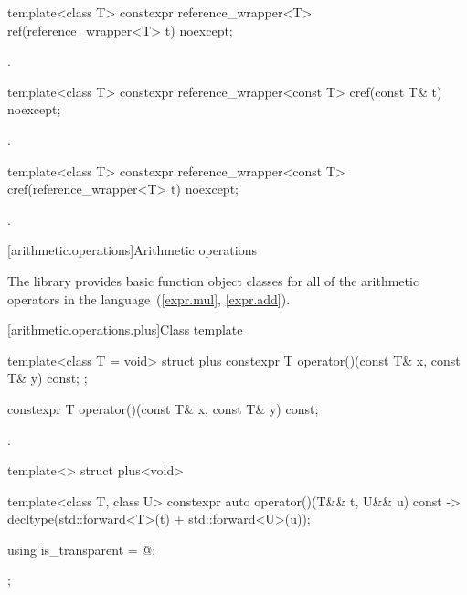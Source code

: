 %
\begin{itemdecl}
template<class T> constexpr reference_wrapper<T> ref(reference_wrapper<T> t) noexcept;
\end{itemdecl}

\begin{itemdescr}
\pnum
\returns
{}.
\end{itemdescr}

%
\begin{itemdecl}
template<class T> constexpr reference_wrapper<const T> cref(const T& t) noexcept;
\end{itemdecl}

\begin{itemdescr}
\pnum
\returns
{}.
\end{itemdescr}

%
\begin{itemdecl}
template<class T> constexpr reference_wrapper<const T> cref(reference_wrapper<T> t) noexcept;
\end{itemdecl}

\begin{itemdescr}
\pnum
\returns
{}.
\end{itemdescr}

[arithmetic.operations]{Arithmetic operations}

\pnum
The library provides basic function object classes for all of the arithmetic
operators in the language~(\ref{expr.mul}, \ref{expr.add}).

[arithmetic.operations.plus]{Class template }

%
\begin{itemdecl}
template<class T = void> struct plus {
  constexpr T operator()(const T& x, const T& y) const;
};
\end{itemdecl}

%
\begin{itemdecl}
constexpr T operator()(const T& x, const T& y) const;
\end{itemdecl}

\begin{itemdescr}
\pnum
\returns
{}.
\end{itemdescr}

%
\begin{itemdecl}
template<> struct plus<void> {
  template<class T, class U> constexpr auto operator()(T&& t, U&& u) const
    -> decltype(std::forward<T>(t) + std::forward<U>(u));

  using is_transparent = @\unspec@;
};
\end{itemdecl}

